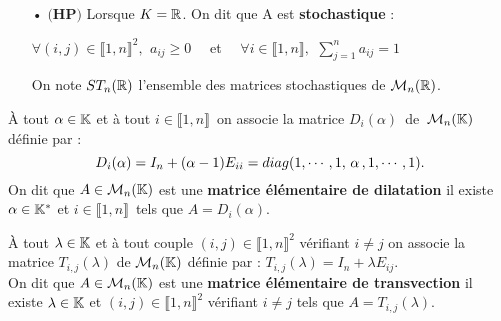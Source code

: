 \begin{itemize}[leftmargin=0cm,rightmargin=0cm]
    \item[•] \(\bigl(\mathbf{H} \mathbf{P}\bigr)\) Lorsque \(K=\mathbb{R}\). On dit que A est \textbf{stochastique} \ssi :\vspace{-0.2cm}
    
    \hspace{3cm}\(\forall (i,j)\in \llbracket 1,n \rrbracket^2,\ \, a_{ij}\geq 0\quad \) et \(\displaystyle \quad \forall i\in \llbracket 1,n \rrbracket,\ \, \sum_{j=1}^{n}a_{ij}=1\)\vspace{0.15cm}\\
    \begin{small}
        On note \(ST_n(\mathbb{R})\) l'ensemble des matrices stochastiques de \(\mathcal{M}_n(\mathbb{R})\).
    \end{small}
\end{itemize}

\vspace{1.4cm}

\noindent À tout \(\alpha \in \mathbb{K}\)\expo{*} et à tout \(i\in \llbracket 1,n \rrbracket \,\) on associe la matrice \(D_i(\alpha)\,\) de \(\,\mathcal{M}_n(\mathbb{K})\) définie par :\vspace{-0.35cm}\\
\[D_i(\alpha)=I_n+(\alpha-1)E_{ii}=diag(1,\cdots,1,\,\alpha\,,1,\cdots,1).\vspace{0.2cm}\]
On dit que \(A\in \mathcal{M}_n(\mathbb{K})\) est une \textbf{matrice élémentaire de dilatation} \ssi il existe \(\alpha\in \mathbb{K}^*\) et \(i\in \llbracket 1,n \rrbracket \,\) tels que \(A=D_i(\alpha)\).

\vspace{1.2cm}

À tout \(\lambda\in\mathbb{K}\) et à tout couple \((i,j)\in \llbracket 1,n \rrbracket ^2\) vérifiant \(i\neq j\) on associe la matrice \(T_{i,j}(\lambda)\) de \(\mathcal{M}_n(\mathbb{K})\) définie par : \(T_{i,j}(\lambda)=I_n+\lambda E_{ij}\).\vspace{0.2cm}\\
On dit que \(A\in \mathcal{M}_n(\mathbb{K})\) est une \textbf{matrice élémentaire de transvection} \ssi il existe \(\lambda\in \mathbb{K}\) et \((i,j)\in \llbracket 1,n \rrbracket ^2\) vérifiant \(i\neq j\) tels que \(A=T_{i,j}(\lambda)\).

\vspace{1.5cm}

